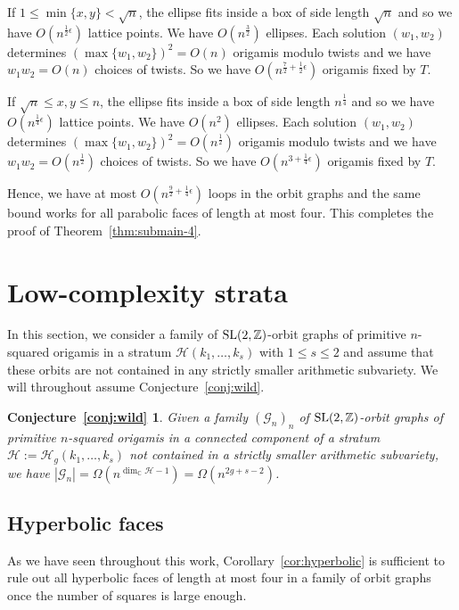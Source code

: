 \documentclass[a4paper,11pt]{amsart}
\numberwithin{equation}{section}
\numberwithin{figure}{section}
\numberwithin{table}{section}
\newtheorem*{conjwild}{Conjecture~\ref*{conj:wild}}
\newcommand{\calH}{\mathcal{H}}
\newcommand{\C}{\mathbb{C}}
\newcommand{\Z}{\mathbb{Z}}
\DeclareMathOperator{\SL}{{\rm{SL}}}
\begin{document}
If $1\leq \min\{x,y\}< \sqrt{n}$, the ellipse fits inside a box of side length $\sqrt{n}$ and so we have $O(n^{\frac{1}{2}\epsilon})$ lattice points. We have $O(n^{\frac{3}{2}})$ ellipses. Each solution $(w_1,w_2)$ determines $(\max\{w_1,w_2\})^{2} = O(n)$ origamis modulo twists and we have $w_1w_2 = O(n)$ choices of twists. So we have $O(n^{\frac{7}{2}+\frac{1}{2}\epsilon})$ origamis fixed by $T$.

If $\sqrt{n}\leq x,y\leq n$, the ellipse fits inside a box of side length $n^{\frac{1}{4}}$ and so we have $O(n^{\frac{1}{4}\epsilon})$ lattice points. We have $O(n^2)$ ellipses. Each solution $(w_1,w_2)$ determines $(\max\{w_1,w_2\})^{2} = O(n^{\frac{1}{2}})$ origamis modulo twists and we have $w_1w_2 = O(n^{\frac{1}{2}})$ choices of twists. So we have $O(n^{3+\frac{1}{4}\epsilon})$ origamis fixed by $T$.

Hence, we have at most $O(n^{\frac{9}{2}+\frac{1}{4}\epsilon})$ loops in the orbit graphs and the same bound works for all parabolic faces of length at most four. This completes the proof of Theorem~\ref{thm:submain-4}.


\section{Low-complexity strata}\label{sec:general}

In this section, we consider a family of $\SL(2,\Z)$-orbit graphs of primitive $n$-squared origamis in a stratum $\calH(k_1,\ldots,k_s)$ with $1\leq s\leq 2$ and assume that these orbits are not contained in any strictly smaller arithmetic subvariety. We will throughout assume Conjecture~\ref{conj:wild}.

\begin{conjwild}
    Given a family $(\mathcal{G}_{n})_{n}$ of $\SL(2,\Z)$-orbit graphs of primitive $n$-squared origamis in a connected component of a stratum $\mathcal{H}:=\calH_{g}(k_{1},\dots,k_{s})$ not contained in a strictly smaller arithmetic subvariety, we have $|\mathcal{G}_{n}| = \Omega(n^{\dim_{\C}\mathcal{H}-1}) = \Omega(n^{2g+s-2})$.
\end{conjwild}

\subsection{Hyperbolic faces}

As we have seen throughout this work, Corollary~\ref{cor:hyperbolic} is sufficient to rule out all hyperbolic faces of length at most four in a family of orbit graphs once the number of squares is large enough.
\end{document}
